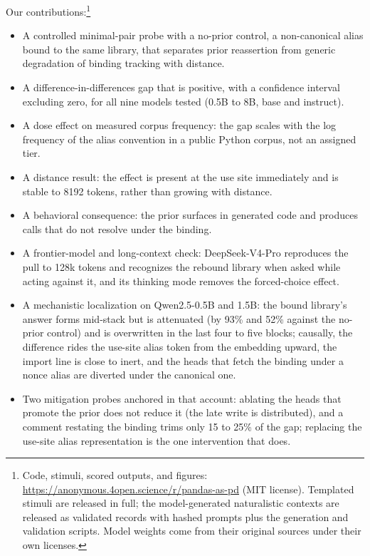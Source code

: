 \documentclass[11pt]{article}
\begin{document}
Our contributions:\footnote{Code, stimuli, scored outputs, and figures: \url{https://anonymous.4open.science/r/pandas-as-pd} (MIT license). Templated stimuli are released in full; the model-generated naturalistic contexts are released as validated records with hashed prompts plus the generation and validation scripts. Model weights come from their original sources under their own licenses.}
\begin{itemize}
\itemsep0.1em
\item A controlled minimal-pair probe with a no-prior control, a non-canonical alias bound to the same library, that separates prior reassertion from generic degradation of binding tracking with distance.
\item A difference-in-differences gap that is positive, with a confidence interval excluding zero, for all nine models tested (0.5B to 8B, base and instruct).
\item A dose effect on measured corpus frequency: the gap scales with the log frequency of the alias convention in a public Python corpus, not an assigned tier.
\item A distance result: the effect is present at the use site immediately and is stable to 8192 tokens, rather than growing with distance.
\item A behavioral consequence: the prior surfaces in generated code and produces calls that do not resolve under the binding.
\item A frontier-model and long-context check: DeepSeek-V4-Pro reproduces the pull to 128k tokens and recognizes the rebound library when asked while acting against it, and its thinking mode removes the forced-choice effect.
\item A mechanistic localization on Qwen2.5-0.5B and 1.5B: the bound library's answer forms mid-stack but is attenuated (by 93\% and 52\% against the no-prior control) and is overwritten in the last four to five blocks; causally, the difference rides the use-site alias token from the embedding upward, the import line is close to inert, and the heads that fetch the binding under a nonce alias are diverted under the canonical one.
\item Two mitigation probes anchored in that account: ablating the heads that promote the prior does not reduce it (the late write is distributed), and a comment restating the binding trims only 15 to 25\% of the gap; replacing the use-site alias representation is the one intervention that does.
\end{itemize}
\end{document}
